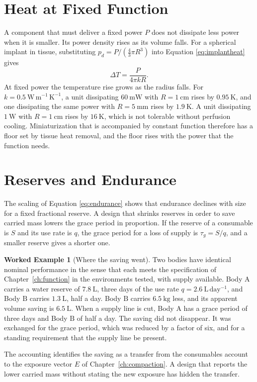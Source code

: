 \documentclass[11pt,openany]{book}
\theoremstyle{definition}
\newtheorem{example}{Worked Example}[chapter]
\theoremstyle{remark}
\begin{document}
\section{Heat at Fixed Function}

A component that must deliver a fixed power $P$ does not dissipate less power when it is smaller. Its power density rises as its volume falls. For a spherical implant in tissue, substituting $p_d=P/(\tfrac{4}{3}\pi R^{3})$ into Equation \eqref{eq:implantheat} gives
\begin{equation}
\Delta T=\frac{P}{4\pi kR}.
\label{eq:fixedpower}
\end{equation}
At fixed power the temperature rise grows as the radius falls. For $k=0.5\ \mathrm{W\,m^{-1}\,K^{-1}}$, a unit dissipating $60\ \mathrm{mW}$ with $R=1\ \mathrm{cm}$ rises by $0.95\ \mathrm{K}$, and one dissipating the same power with $R=5\ \mathrm{mm}$ rises by $1.9\ \mathrm{K}$. A unit dissipating $1\ \mathrm{W}$ with $R=1\ \mathrm{cm}$ rises by $16\ \mathrm{K}$, which is not tolerable without perfusion cooling. Miniaturization that is accompanied by constant function therefore has a floor set by tissue heat removal, and the floor rises with the power that the function needs.

\section{Reserves and Endurance}

The scaling of Equation \eqref{eq:endurance} shows that endurance declines with size for a fixed fractional reserve. A design that shrinks reserves in order to save carried mass lowers the grace period in proportion. If the reserve of a consumable is $S$ and its use rate is $q$, the grace period for a loss of supply is $\tau_g=S/q$, and a smaller reserve gives a shorter one.

\begin{example}[Where the saving went]
\label{ex:wheresaving}
Two bodies have identical nominal performance in the sense that each meets the specification of Chapter~\ref{ch:function} in the environments tested, with supply available. Body $\mathrm{A}$ carries a water reserve of $7.8\ \mathrm{L}$, three days of the use rate $q=2.6\ \mathrm{L\,day^{-1}}$, and Body $\mathrm{B}$ carries $1.3\ \mathrm{L}$, half a day. Body $\mathrm{B}$ carries $6.5\ \mathrm{kg}$ less, and its apparent volume saving is $6.5\ \mathrm{L}$. When a supply line is cut, Body $\mathrm{A}$ has a grace period of three days and Body $\mathrm{B}$ of half a day. The saving did not disappear. It was exchanged for the grace period, which was reduced by a factor of six, and for a standing requirement that the supply line be present.

The accounting identifies the saving as a transfer from the consumables account to the exposure vector $E$ of Chapter~\ref{ch:compaction}. A design that reports the lower carried mass without stating the new exposure has hidden the transfer.
\end{example}
\end{document}
